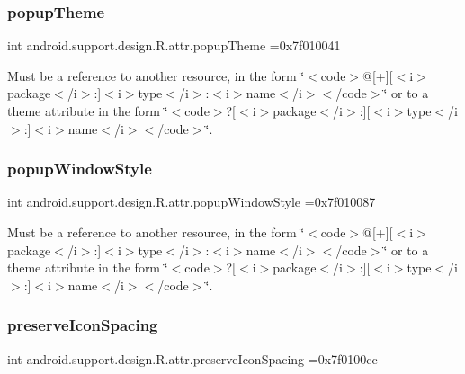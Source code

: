 \subsubsection{\texorpdfstring{popup\+Theme}{popupTheme}}
{\footnotesize\ttfamily int android.\+support.\+design.\+R.\+attr.\+popup\+Theme =0x7f010041\hspace{0.3cm}{\ttfamily [static]}}

Must be a reference to another resource, in the form \char`\"{}$<$code$>$@\mbox{[}+\mbox{]}\mbox{[}$<$i$>$package$<$/i$>$\+:\mbox{]}$<$i$>$type$<$/i$>$\+:$<$i$>$name$<$/i$>$$<$/code$>$\char`\"{} or to a theme attribute in the form \char`\"{}$<$code$>$?\mbox{[}$<$i$>$package$<$/i$>$\+:\mbox{]}\mbox{[}$<$i$>$type$<$/i$>$\+:\mbox{]}$<$i$>$name$<$/i$>$$<$/code$>$\char`\"{}. \mbox{\label{classandroid_1_1support_1_1design_1_1R_1_1attr_a4adafbb4bec0c032be0f4c8652e5ac2b}} 
\subsubsection{\texorpdfstring{popup\+Window\+Style}{popupWindowStyle}}
{\footnotesize\ttfamily int android.\+support.\+design.\+R.\+attr.\+popup\+Window\+Style =0x7f010087\hspace{0.3cm}{\ttfamily [static]}}

Must be a reference to another resource, in the form \char`\"{}$<$code$>$@\mbox{[}+\mbox{]}\mbox{[}$<$i$>$package$<$/i$>$\+:\mbox{]}$<$i$>$type$<$/i$>$\+:$<$i$>$name$<$/i$>$$<$/code$>$\char`\"{} or to a theme attribute in the form \char`\"{}$<$code$>$?\mbox{[}$<$i$>$package$<$/i$>$\+:\mbox{]}\mbox{[}$<$i$>$type$<$/i$>$\+:\mbox{]}$<$i$>$name$<$/i$>$$<$/code$>$\char`\"{}. \mbox{\label{classandroid_1_1support_1_1design_1_1R_1_1attr_abe8b81391e1e9e0383b96c02187df971}} 
\subsubsection{\texorpdfstring{preserve\+Icon\+Spacing}{preserveIconSpacing}}
{\footnotesize\ttfamily int android.\+support.\+design.\+R.\+attr.\+preserve\+Icon\+Spacing =0x7f0100cc\hspace{0.3cm}{\ttfamily [static]}}

